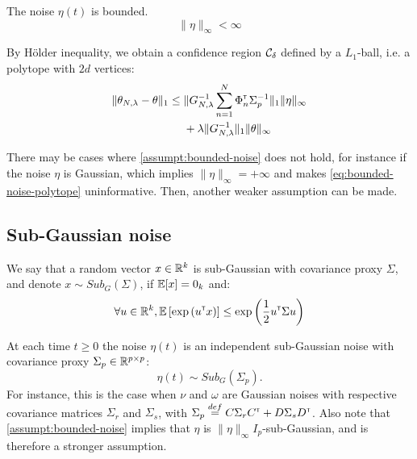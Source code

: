 \documentclass{article}
\begin{document}
\begin{assumption}
\label{assumpt:bounded-noise}
The noise $\eta(t)$ is bounded.
\[\|\eta\|_\infty < \infty\]
\end{assumption}

By Hölder inequality, we obtain a confidence region $\mathcal{C}_\delta$ defined by a $L_1$-ball, i.e. a polytope with $2d$ vertices:
\begin{equation}
\begin{split}
\label{eq:bounded-noise-polytope}
\|\theta_{N,\lambda} - \theta\|_1 \leq {} &\|G_{N, \lambda}^{-1}\sum_{n=1}^N \Phi_n^{\mathsf{\scriptscriptstyle T}} \Sigma_p^{-1}\|_1\|\eta\|_\infty \\
&+ \lambda\|G_{N, \lambda}^{-1}\|_1\|\theta\|_\infty
\end{split}
\end{equation}

There may be cases where \autoref{assumpt:bounded-noise} does not hold, for instance if the noise $\eta$ is Gaussian, which implies $\|\eta\|_\infty=+\infty$ and makes \eqref{eq:bounded-noise-polytope} uninformative. Then, another weaker assumption can be made.

\subsection{Sub-Gaussian noise}

We say that a random vector $x\in\mathbb{R}^k$ is sub-Gaussian with covariance proxy $\Sigma$, and denote $x\sim Sub_G(\Sigma)$, if $\operatorname*{\mathbb{E}}[x] = 0_k$ and:
\[
\forall u\in\mathbb{R}^k, \operatorname*{\mathbb{E}} \left[ \exp{\left( u^{\mathsf{\scriptscriptstyle T}}x\right)}\right] \leq \exp{\left( \frac{1}{2} u^{\mathsf{\scriptscriptstyle T}}\Sigma u\right)}
\]

\begin{assumption}
\label{assumpt:gaussian-noise}
At each time $t\geq0$ the noise $\eta(t)$ is an independent sub-Gaussian noise with covariance proxy $\Sigma_p \in \mathbb{R}^{p\times p}$:
\begin{equation*}
    \eta(t) \sim Sub_G(\Sigma_p).
\end{equation*}
For instance, this is the case when $\nu$ and $\omega$ are Gaussian noises with respective covariance matrices $\Sigma_r$ and $\Sigma_s$, with $\Sigma_p \stackrel{def}{=} C\Sigma_r C^{\mathsf{\scriptscriptstyle T}} + D\Sigma_s D^{\mathsf{\scriptscriptstyle T}}$. Also note that \autoref{assumpt:bounded-noise} implies that $\eta$ is $\|\eta\|_\infty I_p$-sub-Gaussian, and is therefore a stronger assumption.
\end{assumption}
\end{document}
